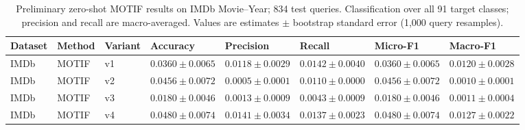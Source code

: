 \begin{table}[htbp]
\centering
\small
\renewcommand{\arraystretch}{1.15}
\setlength{\tabcolsep}{5pt}
\begin{adjustbox}{max width=\linewidth}
\begin{tabular}{|l|l|l|l|l|l|l|l|}
\hline
\textbf{Dataset} & \textbf{Method} & \textbf{Variant} & \textbf{Accuracy} & \textbf{Precision} & \textbf{Recall} & \textbf{Micro-F1} & \textbf{Macro-F1} \\
\hline
IMDb & MOTIF & v1 & $0.0360 \pm 0.0065$ & $0.0118 \pm 0.0029$ & $0.0142 \pm 0.0040$ & $0.0360 \pm 0.0065$ & $0.0120 \pm 0.0028$ \\
\hline
IMDb & MOTIF & v2 & $0.0456 \pm 0.0072$ & $0.0005 \pm 0.0001$ & $0.0110 \pm 0.0000$ & $0.0456 \pm 0.0072$ & $0.0010 \pm 0.0001$ \\
\hline
IMDb & MOTIF & v3 & $0.0180 \pm 0.0046$ & $0.0013 \pm 0.0009$ & $0.0043 \pm 0.0009$ & $0.0180 \pm 0.0046$ & $0.0011 \pm 0.0004$ \\
\hline
IMDb & MOTIF & v4 & $0.0480 \pm 0.0074$ & $0.0141 \pm 0.0034$ & $0.0137 \pm 0.0023$ & $0.0480 \pm 0.0074$ & $0.0127 \pm 0.0022$ \\
\hline
\end{tabular}
\end{adjustbox}
\caption{Preliminary zero-shot MOTIF results on IMDb Movie--Year; 834 test queries. Classification over all 91 target classes; precision and recall are macro-averaged. Values are estimates $\pm$ bootstrap standard error (1,000 query resamples).}
\label{tab:motif-imdb-movie-year-classification}
\end{table}
